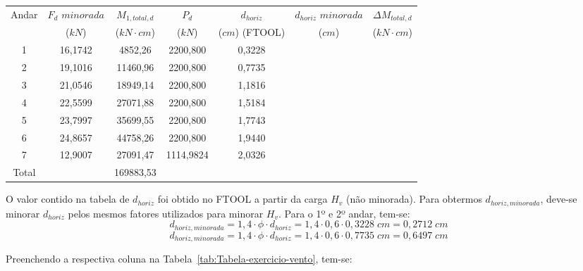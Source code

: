 \begin{table}[H]
\centering
\begin{tabular}{c|c|c|ccc|c}
\hline
Andar & $F_d$ $minorada$ & $M_{1, total, d}$ & \multicolumn{1}{c|}{$P_d$} & \multicolumn{1}{c|}{$d_{horiz}$} & $d_{horiz}$ $minorada$ & $\Delta M_{total, d}$ \\
 & ($kN$) & ($kN\cdot cm$) & \multicolumn{1}{c|}{($kN$)} & \multicolumn{1}{c|}{($cm$) (FTOOL)} & ($cm$) & ($kN\cdot cm$) \\ \hline
1 & 16,1742 & 4852,26 & \multicolumn{1}{c|}{2200,800} & \multicolumn{1}{c|}{0,3228} &  &  \\
2 & 19,1016 & 11460,96 & \multicolumn{1}{c|}{2200,800} & \multicolumn{1}{c|}{0,7735} &  &  \\
3 & 21,0546 & 18949,14 & \multicolumn{1}{c|}{2200,800} & \multicolumn{1}{c|}{1,1816} &  &  \\
4 & 22,5599 & 27071,88 & \multicolumn{1}{c|}{2200,800} & \multicolumn{1}{c|}{1,5184} &  &  \\
5 & 23,7997 & 35699,55 & \multicolumn{1}{c|}{2200,800} & \multicolumn{1}{c|}{1,7743} &  &  \\
6 & 24,8657 & 44758,26 & \multicolumn{1}{c|}{2200,800} & \multicolumn{1}{c|}{1,9440} &  &  \\
7 & 12,9007 & 27091,47 & \multicolumn{1}{c|}{1114,9824} & \multicolumn{1}{c|}{2,0326} &  &  \\ \hline
Total &  & 169883,53 &  &  &  &  \\ \cline{1-1} \cline{3-3} \cline{7-7} 
\end{tabular}
\end{table}

O valor contido na tabela de $d_{horiz}$ foi obtido no FTOOL a partir da carga $H_v$ (não minorada). Para obtermos $d_{horiz, minorada}$, deve-se minorar $d_{horiz}$ pelos mesmos fatores utilizados para minorar $H_v$. Para o 1º e 2º andar, tem-se:
$$d_{horiz, minorada}=1,4\cdot\phi\cdot d_{horiz}=1,4\cdot0,6\cdot 0,3228\;cm=0,2712\;cm$$ $$d_{horiz, minorada}=1,4\cdot\phi\cdot d_{horiz}=1,4\cdot0,6\cdot 0,7735\;cm=0,6497\;cm$$

Preenchendo a respectiva coluna na Tabela~\ref{tab:Tabela-exercicio-vento}, tem-se:

